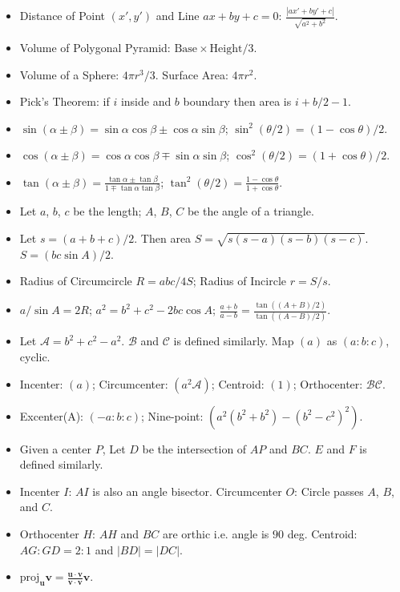 \begin{itemize}
	\item Distance of Point $(x', y')$ and Line $ax + by + c = 0$: $\frac{|ax' + by' + c|}{\sqrt{a^2 + b^2}}$.
	\item Volume of Polygonal Pyramid: $\mathrm{Base} \times \mathrm{Height} / 3$.
	\item Volume of a Sphere: $4 \pi r^3 / 3$. Surface Area: $4 \pi r^2$.
	\item Pick's Theorem: if $i$ inside and $b$ boundary then area is $i + b/2 - 1$.
	\item $\sin(\alpha \pm \beta) = \sin \alpha \cos \beta \pm \cos \alpha \sin \beta$; $\sin^2(\theta/2) = (1 - \cos \theta) / 2$.
	\item $\cos(\alpha \pm \beta) = \cos \alpha \cos \beta \mp \sin \alpha \sin \beta$; $\cos^2(\theta/2) = (1 + \cos \theta) / 2$.
	\item $\tan(\alpha \pm \beta) = \frac{\tan \alpha \pm \tan \beta}{1 \mp \tan \alpha \tan \beta}$; $\tan^2(\theta/2) = \frac{1 - \cos \theta}{1 + \cos \theta}$.
	\item Let $a$, $b$, $c$ be the length; $A$, $B$, $C$ be the angle of a triangle.
	\item Let $s = (a+b+c)/2$. Then area $S = \sqrt{s(s-a)(s-b)(s-c)}$. $S = (bc \sin A) / 2$.
	\item Radius of Circumcircle $R = abc/4S$; Radius of Incircle $r = S/s$.
	\item $a/\sin A = 2R$; $a^2 = b^2 + c^2 - 2bc \cos A$; $\frac{a+b}{a-b} = \frac{\tan((A+B)/2)}{\tan{((A-B)/2)}}$.
	\item Let $\mathcal A = b^2 + c^2 - a^2$. $\mathcal B$ and $\mathcal C$ is defined similarly. Map $(a)$ as $(a : b : c)$, cyclic.
	\item Incenter: $(a)$; Circumcenter: $(a^2\mathcal A)$; Centroid: $(1)$; Orthocenter: $\mathcal B \mathcal C$.
	\item Excenter(A): $(-a : b : c)$; Nine-point: $(a^2(b^2+b^2) - (b^2-c^2)^2)$.
	\item Given a center $P$, Let $D$ be the intersection of $AP$ and $BC$. $E$ and $F$ is defined similarly.
	\item Incenter $I$: $AI$ is also an angle bisector. Circumcenter $O$: Circle passes $A$, $B$, and $C$.
	\item Orthocenter $H$: $AH$ and $BC$ are orthic i.e. angle is $90$ deg. Centroid: $AG : GD = 2 : 1$ and $|BD| = |DC|$.
	\item $\mathrm{proj}_{\mathbf{u}} \mathbf{v} = \frac{\mathbf{u} \cdot \mathbf{v}}{\mathbf{v} \cdot \mathbf{v}} \mathbf{v}$.
\end{itemize}